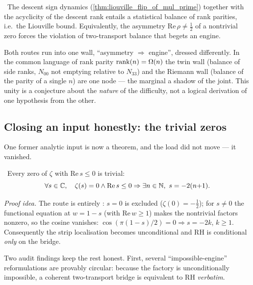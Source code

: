 \begin{conjecture}\label{conj:rank-balance}
\red{}\ The descent sign dynamics (\cref{thm:liouville_flip_of_mul_prime}) together with the
acyclicity of the descent rank entails a statistical balance of rank parities, i.e.\ the Liouville
bound. Equivalently, the asymmetry $\mathrm{Re}\,\rho \ne \tfrac12$ of a nontrivial zero forces the
violation of two-transport balance that begets an engine.
\end{conjecture}

Both routes run into one wall, ``asymmetry $\Rightarrow$ engine'', dressed differently. In the
common language of rank parity $\mathrm{rank}(n) = \Omega(n)$ the twin wall (balance of side ranks,
$N_{00}$ not emptying relative to $N_{33}$) and the Riemann wall (balance of the parity of a single
$n$) are one node --- the marginal a shadow of the joint. This unity is a conjecture about the
\emph{nature} of the difficulty, not a logical derivation of one hypothesis from the other.

\subsection{Closing an input honestly: the trivial zeros}

One former analytic input is now a theorem, and the load did not move --- it vanished.

\begin{theorem}\label{thm:trivialBelowZeroClassification}
\green{}\ Every zero of $\zeta$ with $\mathrm{Re}\,s\le0$ is trivial:
\begin{equation}\label{eq:trivial-zeros}
  \forall s\in\mathbb{C},\quad \zeta(s)=0 \wedge \mathrm{Re}\,s\le0 \Rightarrow \exists n\in\mathbb{N},\ s = -2(n{+}1) .
\end{equation}
\end{theorem}

\emph{Proof idea.} The route is entirely : $s=0$ is excluded
($\zeta(0)=-\tfrac12$); for $s\ne0$ the functional equation at $w=1-s$ (with $\mathrm{Re}\,w\ge1$)
makes the nontrivial factors nonzero, so the cosine vanishes: $\cos(\pi(1-s)/2)=0 \Rightarrow s=-2k$,
$k\ge1$. Consequently the strip localisation becomes unconditional and RH is conditional \emph{only}
on the bridge.

Two audit findings keep the rest honest. First, several ``impossible-engine'' reformulations are
provably circular: because the factory is unconditionally impossible, a coherent two-transport
bridge is equivalent to RH \emph{verbatim}.

